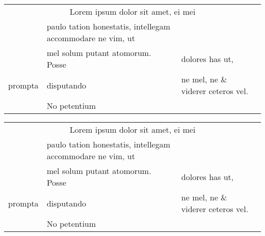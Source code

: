 \documentclass{article}
\begin{document}
\begin{tabular}{llll}
  \multicolumn{4}{c}{Lorem ipsum dolor sit amet, ei mei} \\
  & paulo tation honestatis,
    intellegam accommodare ne vim, ut \\
  & mel solum putant atomorum. Posse & dolores has ut, \\
  prompta & disputando & ne mel, ne
                         \& viderer ceteros vel. \\
  & No petentium
\end{tabular}

\begin{table}[tbp]
  \begin{tabular}{llll}
    \multicolumn{4}{c}{Lorem ipsum dolor sit amet, ei mei} \\
    & paulo tation honestatis,
      intellegam accommodare ne vim, ut \\
    & mel solum putant atomorum. Posse & dolores has ut, \\
    prompta & disputando & ne mel, ne
                           \& viderer ceteros vel. \\
    & No petentium
  \end{tabular}
\end{table}
\end{document}
